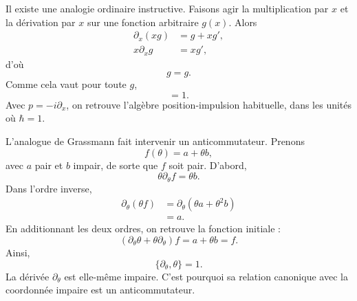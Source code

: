 Il existe une analogie ordinaire instructive. Faisons agir la multiplication par \(x\) et la dérivation par \(x\) sur une fonction arbitraire \(g(x)\). Alors
\begin{align}
\partial_x\!\left(xg\right)&=g+xg',\\
x\partial_xg&=xg',
\end{align}
d’où
\begin{equation}
[\partial_x,x]g=g.
\end{equation}
Comme cela vaut pour toute \(g\),
\begin{equation}
[\partial_x,x]=1.
\end{equation}
Avec \(p=-i\partial_x\), on retrouve l’algèbre position-impulsion habituelle, dans les unités où \(\hbar=1\).

L’analogue de Grassmann fait intervenir un anticommutateur. Prenons
\begin{equation}
f(\theta)=a+\theta b,
\end{equation}
avec \(a\) pair et \(b\) impair, de sorte que \(f\) soit pair. D’abord,
\begin{equation}
\theta\partial_\theta f=\theta b.
\end{equation}
Dans l’ordre inverse,
\begin{align}
\partial_\theta(\theta f)
&=\partial_\theta(\theta a+\theta^2b)\\
&=a.
\end{align}
En additionnant les deux ordres, on retrouve la fonction initiale :
\begin{equation}
\left(\partial_\theta\theta+\theta\partial_\theta\right)f
=a+\theta b=f.
\end{equation}
Ainsi,
\begin{equation}
\boxed{\{\partial_\theta,\theta\}=1.}
\end{equation}
La dérivée \(\partial_\theta\) est elle-même impaire. C’est pourquoi sa relation canonique avec la coordonnée impaire est un anticommutateur.

\begin{classroomqa}
\end{classroomqa}

